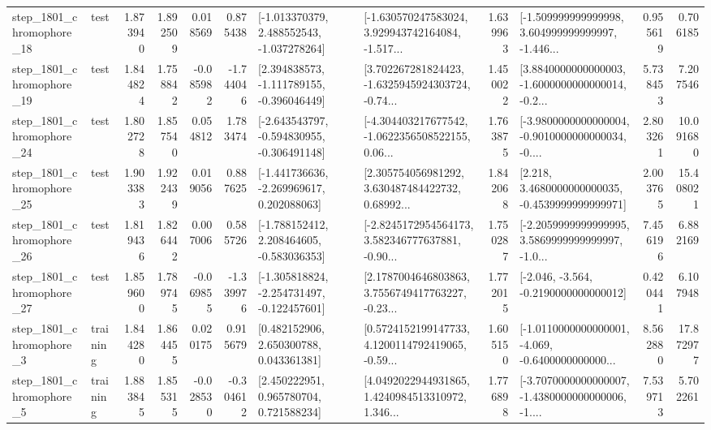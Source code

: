 \begin{tabular}{llrrrrllrlrr}
 step\_1801\_chromophore\_18 &      test &      1.873940 &    1.892509 &      0.018569 &  0.875438 &   [-1.013370379, 2.488552543, -1.037278264] &  [-1.630570247583024, 3.929943742164084, -1.517... &       1.639963 &  [-1.509999999999998, 3.604999999999997, -1.446... &            0.955619 &          0.706185 \\
 step\_1801\_chromophore\_19 &      test &      1.844824 &    1.758842 &     -0.085982 & -1.744046 &   [2.394838573, -1.111789155, -0.396046449] &  [3.702267281824423, -1.6325945924303724, -0.74... &       1.450022 &  [3.8840000000000003, -1.6000000000000014, -0.2... &            5.738453 &          7.207546 \\
 step\_1801\_chromophore\_24 &      test &      1.802728 &    1.857540 &      0.054812 &  1.783474 &  [-2.643543797, -0.594830955, -0.306491148] &  [-4.304403217677542, -1.0622356508522155, 0.06... &       1.763875 &  [-3.9800000000000004, -0.9010000000000034, -0.... &            2.803261 &         10.091680 \\
 step\_1801\_chromophore\_25 &      test &      1.903383 &    1.922439 &      0.019056 &  0.887625 &   [-1.441736636, -2.269969617, 0.202088063] &  [2.305754056981292, 3.630487484422732, 0.68992... &       1.842068 &   [2.218, 3.4680000000000035, -0.4539999999999971] &            2.003765 &         15.408021 \\
 step\_1801\_chromophore\_26 &      test &      1.819436 &    1.826442 &      0.007006 &  0.585726 &   [-1.788152412, 2.208464605, -0.583036353] &  [-2.8245172954564173, 3.582346777637881, -0.90... &       1.750287 &  [-2.2059999999999995, 3.5869999999999997, -1.0... &            7.456196 &          6.882169 \\
 step\_1801\_chromophore\_27 &      test &      1.859600 &    1.789745 &     -0.069855 & -1.339976 &  [-1.305818824, -2.254731497, -0.122457601] &  [2.1787004646803863, 3.7556749417763227, -0.23... &       1.772015 &              [-2.046, -3.564, -0.2190000000000012] &            0.420441 &          6.107948 \\
  step\_1801\_chromophore\_3 &  training &      1.844280 &    1.864455 &      0.020175 &  0.915679 &     [0.482152906, 2.650300788, 0.043361381] &  [0.5724152199147733, 4.1200114792419065, -0.59... &       1.605150 &  [-1.0110000000000001, -4.069, -0.6400000000000... &            8.562880 &         17.872977 \\
  step\_1801\_chromophore\_5 &  training &      1.883845 &    1.855315 &     -0.028530 & -0.304612 &     [2.450222951, 0.965780704, 0.721588234] &  [4.0492022944931865, 1.4240984513310972, 1.346... &       1.776898 &  [-3.7070000000000007, -1.4380000000000006, -1.... &            7.539713 &          5.702261 \\

\end{tabular}
